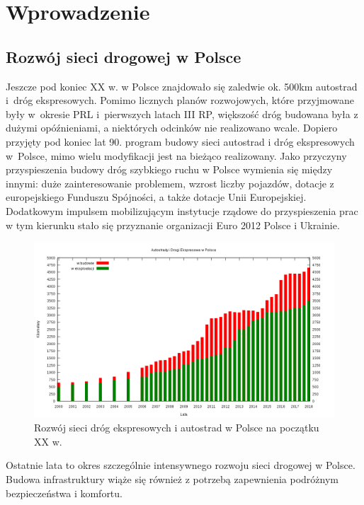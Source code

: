 \chapter{Wprowadzenie}
\section{Rozwój sieci drogowej w Polsce}
Jeszcze pod koniec XX w. w Polsce znajdowało się zaledwie ok. 500km autostrad i~dróg ekspresowych. Pomimo licznych planów rozwojowych, które przyjmowane były w~okresie PRL i~pierwszych latach III RP, większość dróg budowana była z dużymi opóźnieniami, a niektórych odcinków nie realizowano wcale.\newline
Dopiero przyjęty pod koniec lat 90. program budowy sieci autostrad i dróg ekspresowych w~Polsce, mimo wielu modyfikacji jest na bieżąco realizowany. Jako przyczyny\cite{siec-drogowa-IIIrp} przyspieszenia budowy dróg szybkiego ruchu w Polsce wymienia się między innymi: duże zainteresowanie problemem, wzrost liczby pojazdów, dotacje z europejskiego Funduszu Spójności, a także dotacje Unii Europejskiej. Dodatkowym impulsem mobilizującym instytucje rządowe do przyspieszenia prac w tym kierunku stało się przyznanie organizacji Euro 2012 Polsce i Ukrainie.\newline
\begin{figure}[h]
\caption{Rozwój sieci dróg ekspresowych i autostrad w Polsce na początku XX w.}
\includegraphics[width=\textwidth]{images/1024px-PL-Motorways.png}
\end{figure} \newline
Ostatnie lata to okres szczególnie intensywnego rozwoju sieci drogowej w Polsce. Budowa infrastruktury wiąże się również z potrzebą zapewnienia podróżnym bezpieczeństwa i komfortu.
